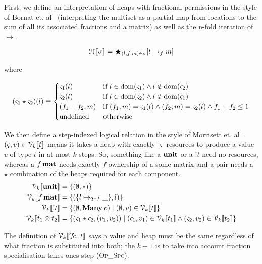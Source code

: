 First, we define an interpretation of heaps with fractional permissions in the
style of Bornat et. al~\cite{bornat} (interpreting the multiset as a partial
map from locations to the sum of all its associated fractions and a matrix) as
well as the n-fold iteration of $\rightarrow$.

\vspace{-\baselineskip}
\[
    \mathcal{H}_{} [\![ \sigma ]\!] = \bigstar_{(l,f,m) \in \sigma} [l \mapsto_f m]
\]

where

\vspace{-\baselineskip}
\[
    (\varsigma_1 \star \varsigma_2)(l) \equiv
    \begin{cases}
        \varsigma_1(l) & \textrm{if } l \in \mathrm{dom}(\varsigma_1) \wedge l \notin \mathrm{dom}(\varsigma_2) \\
        \varsigma_2(l) & \textrm{if } l \in \mathrm{dom}(\varsigma_2) \wedge l \notin \mathrm{dom}(\varsigma_1) \\
        (f_1 + f_2, m) & \textrm{if } (f_1, m) = \varsigma_1(l) \wedge (f_2, m) = \varsigma_2(l) \wedge f_1 + f_2 \leq 1 \\
        \textrm{undefined} & \textrm{otherwise}
    \end{cases}
\]

We then define a step-indexed logical relation in the style of Morrisett et.
al~\cite{ahmed20073}. $(\varsigma, v) \in \mathcal{V}_{k} [\![ t ]\!]$ means it takes a heap with
exactly $\varsigma$ resources to produce a value $v$ of type $t$ in at most $k$
steps. So, something like a $\mathbf{unit}$ or a $!t$ need no resources, whereas
a $f\, \mathbf{mat}$ needs exactly $f$ ownership of a some matrix and a pair
needs a $\star$ combination of the heaps required for each component.
\begin{align*}
  \V{k}{ \Unit } &= \{ (\empH, \ast) \} \\
  \V{k}{ f \, \Mat } &= \{ (\{ l \mapsto_{2^{-f}} \_ \} , l) \} \\
  \V{k}{ \Bang t } &= \{ (\empH, \Many\, v) \mid (\empH, v) \in \V{k}{t} \} \\
  \V{k}{ t_1 \otimes t_2 } &= \{ (\varsigma_1 \star \varsigma_2, ( v_1, v_2 )) \mid (\varsigma_1, v_1) \in \V{k}{t_1} \wedge (\varsigma_2, v_2) \in \V{k}{t_2} \}
\end{align*}

The definition of $\V{k}{ '\!f\!c.\ t}$ says a value and heap
must be the same regardless of what fraction is substituted into both; the
$k-1$ is to take into account fraction specialisation takes ones step
(\textsc{Op\_Spc}).

